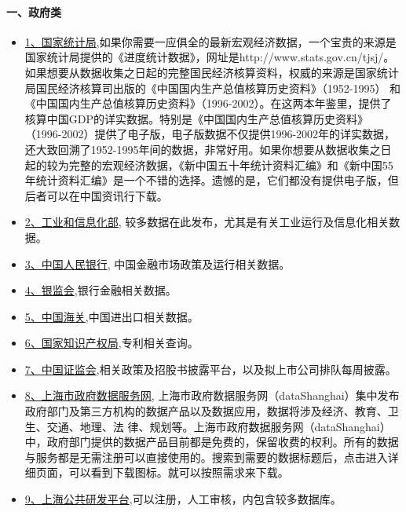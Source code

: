 \documentclass[letterpaper,10pt,english]{sphinxmanual}
\begin{document}
\paragraph{一、政府类}
\label{opendatasource:}\label{opendatasource:id5}\begin{itemize}
\item {} 
\href{http://data.stats.gov.cn/}{1、国家统计局},如果你需要一应俱全的最新宏观经济数据，一个宝贵的来源是国家统计局提供的《进度统计数据》，网址是http://www.stats.gov.cn/tjsj/。 如果想要从数据收集之日起的完整国民经济核算资料，权威的来源是国家统计局国民经济核算司出版的《中国国内生产总值核算历史资料》（1952-1995） 和《中国国内生产总值核算历史资料》（1996-2002）。在这两本年鉴里，提供了核算中国GDP的详实数据。特别是《中国国内生产总值核算历史资料》 （1996-2002）提供了电子版，电子版数据不仅提供1996-2002年的详实数据，还大致回溯了1952-1995年间的数据，非常好用。如果你想要从数据收集之日起的较为完整的宏观经济数据，《新中国五十年统计资料汇编》和《新中国55年统计资料汇编》是一个不错的选择。遗憾的是，它们都没有提供电子版，但后者可以在中国资讯行下载。

\item {} 
\href{http://www.miit.gov.cn}{2、工业和信息化部}, 较多数据在此发布，尤其是有关工业运行及信息化相关数据。

\item {} 
\href{http://www.pbc.gov.cn/}{3、中国人民银行}, 中国金融市场政策及运行相关数据。

\item {} 
\href{http://www.cbrc.gov.cn}{4、银监会},银行金融相关数据。

\item {} 
\href{http://www.customs.gov.cn}{5、中国海关},中国进出口相关数据。

\item {} 
\href{http://www.sipo.gov.cn}{6、国家知识产权局},专利相关查询。

\item {} 
\href{http://www.csrc.gov.cn}{7、中国证监会},相关政策及招股书披露平台，以及拟上市公司排队每周披露。

\item {} 
\href{http://www.datashanghai.gov.cn/gds/home!toHome.action}{8、上海市政府数据服务网}, 上海市政府数据服务网（dataShanghai）集中发布政府部门及第三方机构的数据产品以及数据应用，数据将涉及经济、教育、卫生、交通、地理、法 律、规划等。上海市政府数据服务网（dataShanghai）中，政府部门提供的数据产品目前都是免费的，保留收费的权利。所有的数据与服务都是无需注册可以直接使用的。搜索到需要的数据标题后，点击进入详细页面，可以看到下载图标。就可以按照需求来下载。

\item {} 
\href{http://db.sgst.cn/}{9、上海公共研发平台},可以注册，人工审核，内包含较多数据库。

\end{itemize}
\end{document}
